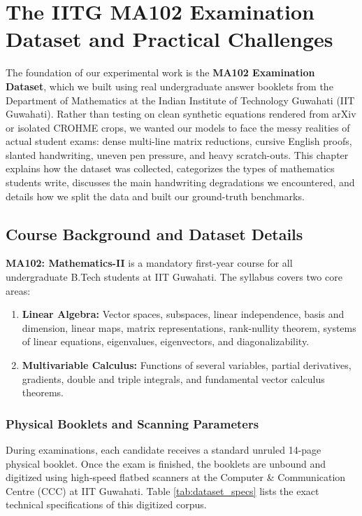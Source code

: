 \chapter{The IITG MA102 Examination Dataset and Practical Challenges}
\label{ch:dataset}

The foundation of our experimental work is the \textbf{MA102 Examination Dataset}, which we built using real undergraduate answer booklets from the Department of Mathematics at the Indian Institute of Technology Guwahati (IIT Guwahati). Rather than testing on clean synthetic equations rendered from arXiv or isolated CROHME crops, we wanted our models to face the messy realities of actual student exams: dense multi-line matrix reductions, cursive English proofs, slanted handwriting, uneven pen pressure, and heavy scratch-outs. This chapter explains how the dataset was collected, categorizes the types of mathematics students write, discusses the main handwriting degradations we encountered, and details how we split the data and built our ground-truth benchmarks.

\section{Course Background and Dataset Details}
\label{sec:dataset_demographics}

\textbf{MA102: Mathematics-II} is a mandatory first-year course for all undergraduate B.Tech students at IIT Guwahati. The syllabus covers two core areas:
\begin{enumerate}
    \item \textbf{Linear Algebra:} Vector spaces, subspaces, linear independence, basis and dimension, linear maps, matrix representations, rank-nullity theorem, systems of linear equations, eigenvalues, eigenvectors, and diagonalizability.
    \item \textbf{Multivariable Calculus:} Functions of several variables, partial derivatives, gradients, double and triple integrals, and fundamental vector calculus theorems.
\end{enumerate}

\subsection{Physical Booklets and Scanning Parameters}
During examinations, each candidate receives a standard unruled 14-page physical booklet. Once the exam is finished, the booklets are unbound and digitized using high-speed flatbed scanners at the Computer \& Communication Centre (CCC) at IIT Guwahati. Table \ref{tab:dataset_specs} lists the exact technical specifications of this digitized corpus.

